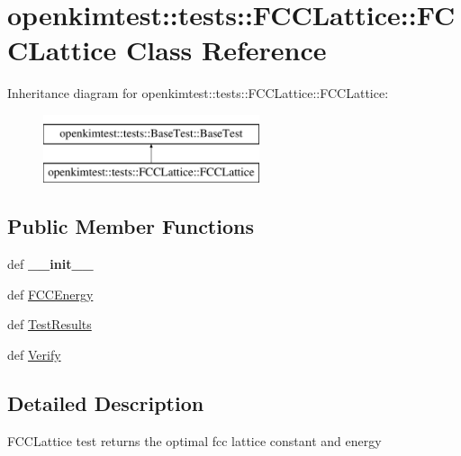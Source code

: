 \hypertarget{classopenkimtest_1_1tests_1_1FCCLattice_1_1FCCLattice}{
\section{openkimtest::tests::FCCLattice::FCCLattice Class Reference}
\label{classopenkimtest_1_1tests_1_1FCCLattice_1_1FCCLattice}
}
Inheritance diagram for openkimtest::tests::FCCLattice::FCCLattice:\begin{figure}[H]
\begin{center}
\leavevmode
\includegraphics[height=2.000000cm]{classopenkimtest_1_1tests_1_1FCCLattice_1_1FCCLattice}
\end{center}
\end{figure}
\subsection*{Public Member Functions}
\begin{DoxyCompactItemize}
\item 
\hypertarget{classopenkimtest_1_1tests_1_1FCCLattice_1_1FCCLattice_a88f6cf2c0084401d6914c8d35e4906d9}{
def {\bfseries \_\-\_\-init\_\-\_\-}}
\label{classopenkimtest_1_1tests_1_1FCCLattice_1_1FCCLattice_a88f6cf2c0084401d6914c8d35e4906d9}

\item 
def \hyperlink{classopenkimtest_1_1tests_1_1FCCLattice_1_1FCCLattice_ae2d77af5e0b7c66890c3afc69f67c1ac}{FCCEnergy}
\item 
def \hyperlink{classopenkimtest_1_1tests_1_1FCCLattice_1_1FCCLattice_aea36635dd28b6108e8887e4620031a68}{TestResults}
\item 
def \hyperlink{classopenkimtest_1_1tests_1_1FCCLattice_1_1FCCLattice_a69fb263d9d74811896d5cd50f9b3f0f1}{Verify}
\end{DoxyCompactItemize}


\subsection{Detailed Description}
\begin{DoxyVerb}FCCLattice test returns the optimal fcc lattice constant and energy\end{DoxyVerb}
 

